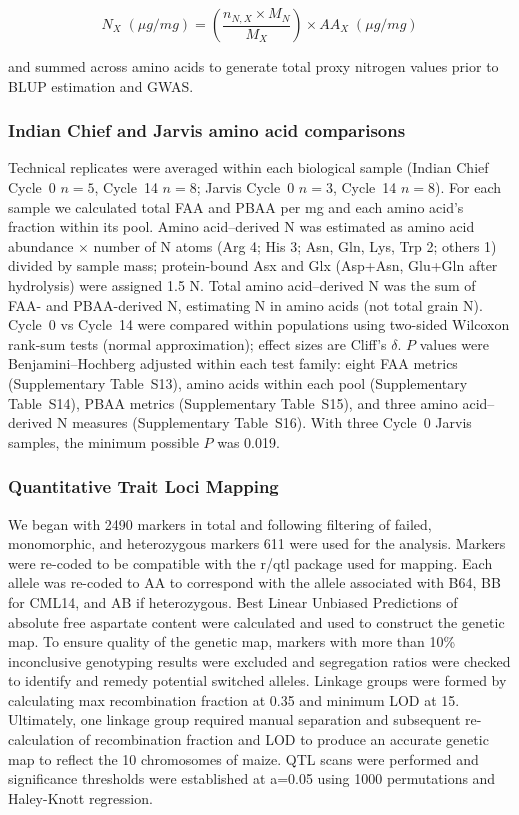 \[
N_X\;(\mu g/mg) =
\left(
\frac{n_{N,X}\times M_N}{M_X}
\right)
\times AA_X\;(\mu g/mg)
\]

and summed across amino acids to generate total proxy nitrogen values prior to BLUP estimation and GWAS.

\subsubsection{Indian Chief and Jarvis amino acid comparisons}
Technical replicates were averaged within each biological sample (Indian Chief Cycle~0 $n = 5$, Cycle~14 $n = 8$; Jarvis Cycle~0 $n = 3$, Cycle~14 $n = 8$). For each sample we calculated total FAA and PBAA per mg and each amino acid’s fraction within its pool. Amino acid–derived N was estimated as amino acid abundance $\times$ number of N atoms (Arg 4; His 3; Asn, Gln, Lys, Trp 2; others 1) divided by sample mass; protein-bound Asx and Glx (Asp+Asn, Glu+Gln after hydrolysis) were assigned 1.5 N. Total amino acid–derived N was the sum of FAA- and PBAA-derived N, estimating N in amino acids (not total grain N). Cycle~0 vs Cycle~14 were compared within populations using two-sided Wilcoxon rank-sum tests (normal approximation); effect sizes are Cliff’s $\delta$. $P$ values were Benjamini–Hochberg adjusted within each test family: eight FAA metrics (Supplementary Table~S13), amino acids within each pool (Supplementary Table~S14), PBAA metrics (Supplementary Table~S15), and three amino acid–derived N measures (Supplementary Table~S16). With three Cycle~0 Jarvis samples, the minimum possible $P$ was 0.019.

\subsubsection{Quantitative Trait Loci Mapping}
We began with 2490 markers in total and following filtering of failed, monomorphic, and heterozygous markers 611 were used for the analysis. Markers were re-coded to be compatible with the r/qtl \citep{Broman2003} package used for mapping. Each allele was re-coded to AA to correspond with the allele associated with B64, BB for CML14, and AB if heterozygous. Best Linear Unbiased Predictions of absolute free aspartate content were calculated and used to construct the genetic map. To ensure quality of the genetic map, markers with more than 10\% inconclusive genotyping results were excluded and segregation ratios were checked to identify and remedy potential switched alleles. Linkage groups were formed by calculating max recombination fraction at 0.35 and minimum LOD at 15. Ultimately, one linkage group required manual separation and subsequent re-calculation of recombination fraction and LOD to produce an accurate genetic map to reflect the 10 chromosomes of maize. QTL scans were performed and significance thresholds were established at a=0.05 using 1000 permutations and Haley-Knott regression.

